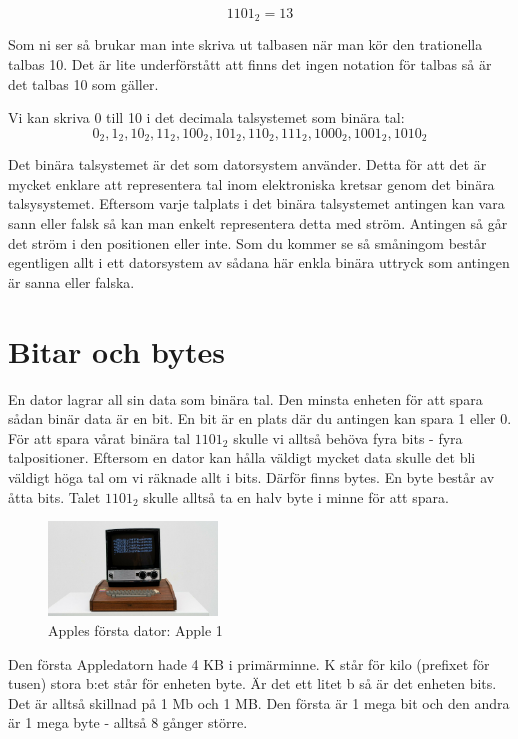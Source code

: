 \documentclass[12pt, letterpaper]{report}
\begin{document}
\[1101_2 = 13\]

Som ni ser så brukar man inte skriva ut talbasen när man kör den trationella talbas 10. Det är lite underförstått att finns det ingen notation för talbas så är det talbas 10 som gäller.

Vi kan skriva 0 till 10 i det decimala talsystemet som binära tal:
\[ 0_2,1_2,10_2,11_2,100_2,101_2,110_2,111_2,1000_2,1001_2,1010_2\]

Det binära talsystemet är det som datorsystem använder. Detta för att det är mycket enklare att representera tal inom elektroniska kretsar genom det binära talsysystemet. Eftersom varje talplats i det binära talsystemet antingen kan vara sann eller falsk så kan man enkelt representera detta med ström. Antingen så går det ström i den positionen eller inte. Som du kommer se så småningom består egentligen allt i ett datorsystem av sådana här enkla binära uttryck som antingen är sanna eller falska. 

\section{Bitar och bytes}
En dator lagrar all sin data som binära tal. Den minsta enheten för att spara sådan binär data är en bit. En bit är en plats där du antingen kan spara 1 eller 0. För att spara vårat binära tal $1101_2$ skulle vi alltså behöva fyra bits - fyra talpositioner. Eftersom en dator kan hålla väldigt mycket data skulle det bli väldigt höga tal om vi räknade allt i bits. Därför finns bytes. En byte består av åtta bits. Talet $1101_2$ skulle alltså ta en halv byte i minne för att spara. 

\begin{figure}[h]
    \centering
    \includegraphics[width=0.4\textwidth]{apple101}
    \caption{Apples första dator: Apple 1}
    \label{fig:mesh1}
\end{figure}

Den första Appledatorn hade 4 KB i primärminne. K står för kilo (prefixet för tusen) stora b:et står för enheten byte. Är det ett litet b så är det enheten bits. Det är alltså skillnad på 1 Mb och 1 MB. Den första är 1 mega bit och den andra är 1 mega byte - alltså 8 gånger större.  
\end{document}
